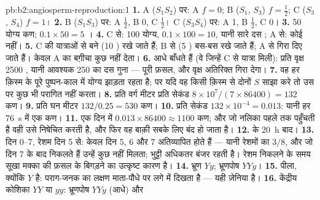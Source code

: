 \begin{solution}{pb:b2:angiosperm-reproduction:1}
\textbf{1.} A ($S_1S_2$) पर:  A $f = 0$; B ($S_1$, $S_3$) $f =
\tfrac12$; C ($S_3$, $S_4$) $f = 1$।
\textbf{2.} B ($S_1S_3$) पर: A $\tfrac12$, B 0, C $\tfrac12$। C
($S_3S_4$) पर: A 1, B $\tfrac12$, C 0।
\textbf{3.} 50 योग्य कण; $0.1\times 50 = 5$ ।
\textbf{4.} C से: 100 योग्य, $0.1\times 100 = 10$, यानी सारे
दस ; A से: कोई नहीं।
\textbf{5.} C की यात्राओं से बने  (10 ) रखे जाते हैं; B से (5 )
बस-बस रखे जाते हैं; A से गिरा दिए जाते हैं। केवल A का बग़ीचा कुछ नहीं देता।
\textbf{6.} आधे   बाँधते हैं (वे जिन्हें C से यात्रा मिली): प्रति
वृक्ष 2500 , यानी आवश्यक 250 का दस गुना --- पूरी फ़सल, और
वृक्ष अतिरिक्त गिरा देगा।
\textbf{7.} वह हर क़िस्म के पूरे पुष्पन-काल में योग्य  झाड़ता रहता है;
पर यदि वह किसी क़िस्म से दोनों $S$  साझा करे
तो उस पर कुछ भी परागित नहीं करता।
\textbf{8.} प्रति वर्ग मीटर प्रति सेकंड $8\times 10^{7}/(7\times 86400) = 132$
कण।
\textbf{9.} प्रति घन मीटर $132/0.25 = 530$ कण।
\textbf{10.} प्रति सेकंड $132\times 10^{-4} = 0.013$: यानी हर
\qty{76}{s} में एक कण।
\textbf{11.} एक दिन में $0.013\times 86400 \approx 1100$ कण; और जो नलिका
पहले  तक पहुँचती है वही उसे निषेचित करती है, और फिर वह  बाक़ी
सबके लिए बंद हो जाता है।
\textbf{12.}  के \qty{20}{h} बाद।
\textbf{13.}  दिन 0--7, रेशम दिन 5 से: केवल दिन 5, 6 और
7 अतिव्यापित होते हैं --- यानी रेशमों का $3/8$, और जो दिन 7 के बाद
निकलते हैं उन्हें कुछ नहीं मिलता; भुट्टी अधिकतर बंजर रहती है।
रेशम निकलने के समय सूखा मक्का की फ़सल के बिगड़ने का उत्कृष्ट कारण है।
\textbf{14.} भ्रूण $Yy$; भ्रूणपोष $YYy$।
\textbf{15.} पीला, क्योंकि $Y$  है: पराग-जनक का लक्षण
माता-पौधे पर लगे  में दिखता है --- यही ज़ेनिया है।
\textbf{16.} केंद्रीय कोशिका $YY$ या $yy$: भ्रूणपोष $YYy$ (आधे) और

\end{solution}
